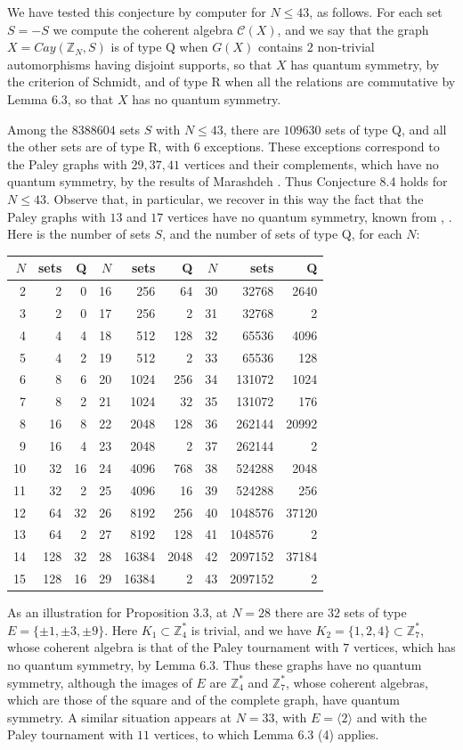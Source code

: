\documentclass[11pt]{amsart}
\newcommand{\C}{\mathcal C}
\newcommand{\Z}{\mathbb Z}
\begin{document}
We have tested this conjecture by computer for $N\leq43$, as follows. For each set $S=-S$ we compute the coherent algebra $\C(X)$, and we say that the graph $X=Cay(\Z_N,S)$ is of type Q when $G(X)$ contains $2$ non-trivial automorphisms having disjoint supports, so that $X$ has quantum symmetry, by the criterion of Schmidt, and of type R when all the relations are commutative by Lemma 6.3, so that $X$ has no quantum symmetry.

Among the $8388604$ sets $S$ with $N\leq43$, there are $109630$ sets of type Q, and all the other sets are of type R, with $6$ exceptions. These exceptions correspond to the Paley graphs with $29,37,41$ vertices and their complements, which have no quantum symmetry, by the results of Marashdeh \cite{mar}. Thus Conjecture 8.4 holds for $N\leq43$. Observe that, in particular, we recover in this way the fact that the Paley graphs with $13$ and $17$ vertices have no quantum symmetry, known from \cite{cha}, \cite{scd}. Here is the number of sets $S$, and the number of sets of type Q, for each $N$:
\begin{center}
\begin{tabular}{rrr@{\qquad\quad}rrr@{\qquad\quad}rrr}
\toprule
$N$&sets&Q&$N$&sets&Q&$N$&sets&Q\\
\midrule
2&2&0&16&256&64&30&32768&2640\\
3&2&0&17&256&2&31&32768&2\\
4&4&4&18&512&128&32&65536&4096\\
5&4&2&19&512&2&33&65536&128\\
6&8&6&20&1024&256&34&131072&1024\\
7&8&2&21&1024&32&35&131072&176\\
8&16&8&22&2048&128&36&262144&20992\\
9&16&4&23&2048&2&37&262144&2\\
10&32&16&24&4096&768&38&524288&2048\\
11&32&2&25&4096&16&39&524288&256\\
12&64&32&26&8192&256&40&1048576&37120\\
13&64&2&27&8192&128&41&1048576&2\\
14&128&32&28&16384&2048&42&2097152&37184\\
15&128&16&29&16384&2&43&2097152&2\\
\bottomrule
\end{tabular}
\end{center}

As an illustration for Proposition 3.3, at $N=28$ there are $32$ sets of type $E=\{\pm1,\pm3,\pm9\}$. Here $K_1\subset\Z_4^*$ is trivial, and we have $K_2=\{1,2,4\}\subset\Z_7^*$, whose coherent algebra is that of the Paley tournament with $7$ vertices, which has no quantum symmetry, by Lemma 6.3. Thus these graphs have no quantum symmetry, although the images of $E$ are $\Z_4^*$ and $\Z_7^*$, whose coherent algebras, which are those of the square and of the complete graph, have quantum symmetry. A similar situation appears at $N=33$, with $E=\langle2\rangle$ and with the Paley tournament with $11$ vertices, to which Lemma 6.3 (4) applies.
\end{document}
